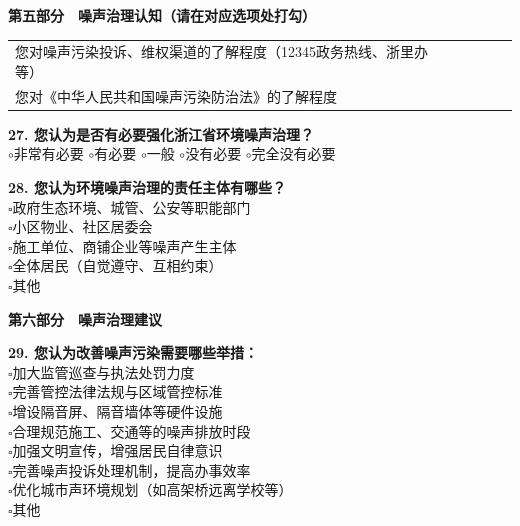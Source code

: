 \begin{appendices}
\begin{center}
\textbf{第五部分　噪声治理认知（请在对应选项处打勾）}
\end{center}

\begin{table}[H]
\centering
{}
\begin{tabular}{|M{5.2cm}|M{1.6cm}|M{1.6cm}|M{1.6cm}|M{1.6cm}|M{1.6cm}|}
\hline
{}
 &  &  &  &  &  \\
\hline
您对噪声污染投诉、维权渠道的了解程度（12345政务热线、浙里办等） & & & & & \\
\hline
您对《中华人民共和国噪声污染防治法》的了解程度 & & & & & \\
\hline
\end{tabular}
\end{table}

\textbf{27. 您认为是否有必要强化浙江省环境噪声治理？}\\
$\circ$非常有必要 \quad $\circ$有必要 \quad $\circ$一般 \quad $\circ$没有必要 \quad $\circ$完全没有必要

\textbf{28. 您认为环境噪声治理的责任主体有哪些？}\\
$\square$政府生态环境、城管、公安等职能部门\\
$\square$小区物业、社区居委会\\
$\square$施工单位、商铺企业等噪声产生主体\\
$\square$全体居民（自觉遵守、互相约束）\\
$\square$其他 \underline{\hspace{3cm}}

\begin{center}
\textbf{第六部分　噪声治理建议}
\end{center}

\textbf{29. 您认为改善噪声污染需要哪些举措：}\\
$\square$加大监管巡查与执法处罚力度\\
$\square$完善管控法律法规与区域管控标准\\
$\square$增设隔音屏、隔音墙体等硬件设施\\
$\square$合理规范施工、交通等的噪声排放时段\\
$\square$加强文明宣传，增强居民自律意识\\
$\square$完善噪声投诉处理机制，提高办事效率\\
$\square$优化城市声环境规划（如高架桥远离学校等）\\
$\square$其他 \underline{\hspace{3cm}}


\end{appendices}
